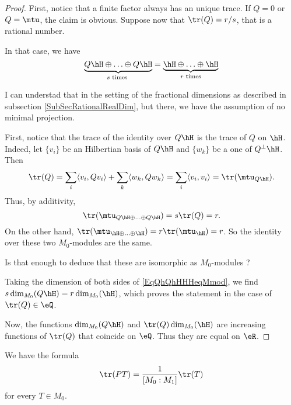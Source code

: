 \begin{proof}
First, notice that a finite factor always has an unique trace. If $Q=0$ or $Q=\mtu$, the claim is obvious. Suppose now that $\tr(Q)=r/s$, that is a rational number.

In that case, we have
\begin{equation}		 \label{EqQhQhHHHeqMmod}
    \underbrace{Q\hH\oplus\ldots\oplus Q\hH}_{s\text{ times }} =\underbrace{\hH\oplus\ldots\oplus \hH}_{ r\text{ times}} 
\end{equation}
\begin{probleme}
I can understad that in the setting of the fractional dimensions as described in subsection \ref{SubSecRationalRealDim}, but there, we have the assumption of no minimal projection.
\end{probleme}
First, notice that the trace of the identity over $Q\hH$ is the trace of $Q$ on $\hH$. Indeed, let $\{ v_i \}$ be an Hilbertian basis of $Q\hH$ and $\{ w_k \}$ be a one of $Q^{\perp}\hH$. Then
\begin{equation}	
	\tr(Q)=\sum_i\langle v_i, Qv_i\rangle +\sum_k\langle w_k, Qw_k\rangle =\sum_i\langle v_i, v_i\rangle =\tr(\mtu_{Q\hH}).
\end{equation}
Thus, by additivity, 
\begin{equation}
	\tr(\mtu_{Q\hH\oplus\ldots\oplus Q\hH})=s\tr(Q)=r.
\end{equation}
On the other hand, $\tr(\mtu_{\hH\oplus\ldots\oplus\hH})=r\tr(\mtu_{\hH})=r$. So the identity over these two $M_0$-modules are the same.
\begin{probleme}
Is that enough to deduce that these are isomorphic as $M_0$-modules ?
\end{probleme}
Taking the dimension of both sides of \eqref{EqQhQhHHHeqMmod}, we find $s\dim_{M_0}(Q\hH)=r\dim_{M_0}(\hH)$, which proves the statement in the case of $\tr(Q)\in\eQ$.

Now, the functions $\dim_{M_0}(Q\hH)$ and $\tr(Q)\dim_{M_0}(\hH)$ are increasing functions of $\tr(Q)$ that coincide on $\eQ$. Thus they are equal on $\eR$.

\end{proof}



\begin{proposition}		\label{ProptrPTMNtrT}
We have the formula
\begin{equation}		\label{EqClaimLemPTfracMNtrT}
	\tr(PT)=\frac{1}{ [M_0:M_1] }\tr(T)
\end{equation}
for every $T\in M_0$.
\end{proposition}


